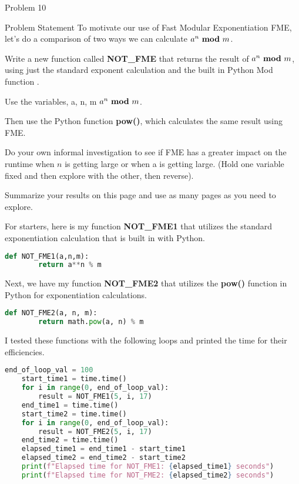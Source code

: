 \begin{problem}{Problem 10}
    \begin{statement}{Problem Statement}
        To motivate our use of Fast Modular Exponentiation FME, let’s do a comparison of two ways we can calculate $a^{n} \text{ \textbf{mod} } m$. \vspace*{1em}

        Write a new function called \textbf{NOT\_FME} that returns the result of $a^{n} \text{ \textbf{mod} } m$, using just the standard exponent calculation and the built in Python Mod function \modulo. \vspace*{1em}

        Use the variables, a, n, m $a^{n} \text{ \textbf{mod} } m$. \vspace*{1em}

        Then use the Python function \textbf{pow()}, which calculates the same result using FME. \vspace*{1em}

        Do your own informal investigation to see if FME has a greater impact on the runtime when $n$ is getting large or when a is getting large. (Hold one variable fixed and then explore with the 
        other, then reverse). \vspace*{1em}

        Summarize your results on this page and use as many pages as you need to explore.
    \end{statement}

    \begin{Highlight}[Solution]
        For starters, here is my function \textbf{NOT\_FME1} that utilizes the standard exponentiation calculation that is built in with Python.
    \begin{lstlisting}[style=stackoverflow, language=python]
    def NOT_FME1(a,n,m):
        return a**n % m
    \end{lstlisting}

        Next, we have my function \textbf{NOT\_FME2} that utilizes the \textbf{pow()} function in Python for exponentiation calculations.
    \begin{lstlisting}[style=stackoverflow, language=python]
    def NOT_FME2(a, n, m):
        return math.pow(a, n) % m
    \end{lstlisting}

        I tested these functions with the following loops and printed the time for their efficiencies.
    \begin{lstlisting}[style=stackoverflow, language=python]
    end_of_loop_val = 100
    start_time1 = time.time()
    for i in range(0, end_of_loop_val):
        result = NOT_FME1(5, i, 17)
    end_time1 = time.time()
    start_time2 = time.time()
    for i in range(0, end_of_loop_val):
        result = NOT_FME2(5, i, 17)
    end_time2 = time.time()
    elapsed_time1 = end_time1 - start_time1
    elapsed_time2 = end_time2 - start_time2
    print(f"Elapsed time for NOT_FME1: {elapsed_time1} seconds")
    print(f"Elapsed time for NOT_FME2: {elapsed_time2} seconds")
    \end{lstlisting}


\end{Highlight}
\end{problem}
